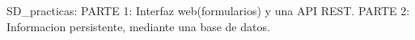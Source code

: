 
SD_practicas:
  PARTE 1:
    Interfaz web(formularios) y una API REST.
  PARTE 2:
    Informacion persistente, mediante una base de datos.  